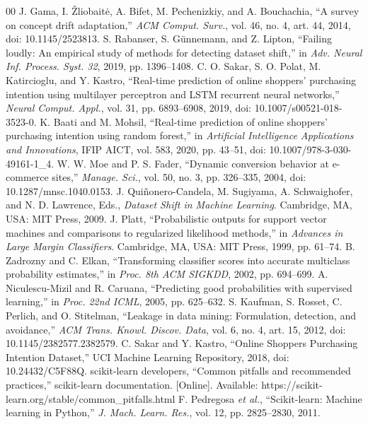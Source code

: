 \documentclass[conference]{IEEEtran}
\begin{document}
\begin{thebibliography}{00}
 J. Gama, I. \v{Z}liobait\.{e}, A. Bifet, M. Pechenizkiy, and A. Bouchachia, ``A survey on concept drift adaptation,'' \emph{ACM Comput. Surv.}, vol. 46, no. 4, art. 44, 2014, doi: 10.1145/2523813.
 S. Rabanser, S. G\"unnemann, and Z. Lipton, ``Failing loudly: An empirical study of methods for detecting dataset shift,'' in \emph{Adv. Neural Inf. Process. Syst. 32}, 2019, pp. 1396--1408.
 C. O. Sakar, S. O. Polat, M. Katircioglu, and Y. Kastro, ``Real-time prediction of online shoppers' purchasing intention using multilayer perceptron and LSTM recurrent neural networks,'' \emph{Neural Comput. Appl.}, vol. 31, pp. 6893--6908, 2019, doi: 10.1007/s00521-018-3523-0.
 K. Baati and M. Mohsil, ``Real-time prediction of online shoppers' purchasing intention using random forest,'' in \emph{Artificial Intelligence Applications and Innovations}, IFIP AICT, vol. 583, 2020, pp. 43--51, doi: 10.1007/978-3-030-49161-1\_4.
 W. W. Moe and P. S. Fader, ``Dynamic conversion behavior at e-commerce sites,'' \emph{Manage. Sci.}, vol. 50, no. 3, pp. 326--335, 2004, doi: 10.1287/mnsc.1040.0153.
 J. Qui\~nonero-Candela, M. Sugiyama, A. Schwaighofer, and N. D. Lawrence, Eds., \emph{Dataset Shift in Machine Learning}. Cambridge, MA, USA: MIT Press, 2009.
 J. Platt, ``Probabilistic outputs for support vector machines and comparisons to regularized likelihood methods,'' in \emph{Advances in Large Margin Classifiers}. Cambridge, MA, USA: MIT Press, 1999, pp. 61--74.
 B. Zadrozny and C. Elkan, ``Transforming classifier scores into accurate multiclass probability estimates,'' in \emph{Proc. 8th ACM SIGKDD}, 2002, pp. 694--699.
 A. Niculescu-Mizil and R. Caruana, ``Predicting good probabilities with supervised learning,'' in \emph{Proc. 22nd ICML}, 2005, pp. 625--632.
 S. Kaufman, S. Rosset, C. Perlich, and O. Stitelman, ``Leakage in data mining: Formulation, detection, and avoidance,'' \emph{ACM Trans. Knowl. Discov. Data}, vol. 6, no. 4, art. 15, 2012, doi: 10.1145/2382577.2382579.
 C. Sakar and Y. Kastro, ``Online Shoppers Purchasing Intention Dataset,'' UCI Machine Learning Repository, 2018, doi: 10.24432/C5F88Q.
 scikit-learn developers, ``Common pitfalls and recommended practices,'' scikit-learn documentation. [Online]. Available: https://scikit-learn.org/stable/common\_pitfalls.html
 F. Pedregosa \emph{et al.}, ``Scikit-learn: Machine learning in Python,'' \emph{J. Mach. Learn. Res.}, vol. 12, pp. 2825--2830, 2011.

\end{thebibliography}
\end{document}
